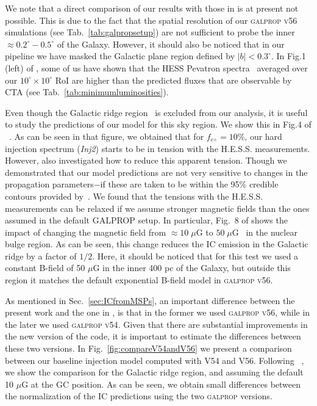 \documentclass[doublespace,nopageskip]{VTthesis} %
\begin{document}
\begin{appendices}
 We note that a direct comparison of our results with those in \citet{Hooper:2018fih} is at present not possible. This is due to the fact that the spatial resolution of our \textsc{galprop v56} simulations (see Tab.~\ref{tab:galpropsetup}) are not sufficient to probe the inner $\approx 0.2^\circ-0.5^\circ$ of the Galaxy. However, it should also be noticed that in our pipeline we have masked the Galactic plane region defined by $|b|<0.3^\circ$. In Fig.1 (left) of \citep{Rinchiuso:2020skh}, some of us have shown that the HESS Pevatron spectra~\citep{Abramowski:2016mir} averaged over our $10^\circ \times 10^\circ$ RoI are higher than the predicted fluxes that are observable by CTA (see Tab.~\ref{tab:minimumluminosities}). 


Even though the Galactic ridge region~\citep{Aharonian:2006au} is excluded from our analysis, it is useful to study the predictions of our model for this sky region. We show this in Fig.4 of ~\citep{Song:2019nrx}. As can be seen in that figure,
we obtained that for $f_{e^\pm} = 10\%$, our hard injection spectrum (\textit{Inj2}) starts to be in tension with the H.E.S.S. measurements. However, \citet{Song:2019nrx} also investigated how to reduce this apparent tension. Though we demonstrated that our model predictions are not very sensitive to changes in the propagation parameters$-$if these are taken to be within the 95\% credible contours provided by~\citet{Johannesson:2016rlh}. We found that the tensions with the H.E.S.S. measurements can be relaxed if we assume stronger magnetic fields than the ones assumed in the default GALPROP setup. In particular, Fig.~8 of \citet{Song:2019nrx} shows the impact of changing the magnetic field from  $\approx 10\; \mu$G to $50\;\mu$G~\citep{Crocker:2010xc} in the nuclear bulge region. As can be seen, this change reduces the IC emission in the Galactic ridge by a factor of $1/2$.  Here, it should be noticed that for this test we used a constant B-field of 50 $\mu$G in the inner 400 pc of the Galaxy, but outside this region it matches the default exponential B-field model in \textsc{galprop v56}.  

As mentioned in Sec.~\ref{sec:ICfromMSPs}, an important difference between the present work and the one in \citep{Song:2019nrx}, is that in the former we used \textsc{galprop v56}, while in the later we used \textsc{galprop v54}. Given that there are substantial improvements in the new version of the code, it is important to estimate the differences between these two versions. In Fig.~\ref{fig:compareV54andV56} we present a comparison between our baseline injection model computed with V54 and V56. Following ~\citep{Song:2019nrx}, we show the comparison for the Galactic ridge region, and assuming the default 10 $\mu$G at the GC position. As can be seen, we obtain small differences between the normalization of the IC predictions using the two \textsc{galprop} versions.
 

\end{appendices}
\end{document}
